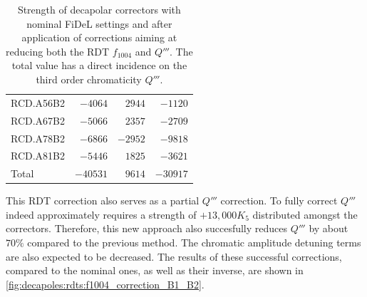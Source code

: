 \begin{table}[!htb]
\begin{tabular}{lrrr}
    \hspace{2mm}RCD.A56B2 &$-4064$ & $2944 $ &  $-1120 $\\
    \hspace{2mm}RCD.A67B2 &$-5066$ & $2357 $ &  $-2709 $\\
    \hspace{2mm}RCD.A78B2 &$-6866$ & $-2952$ &  $-9818 $\\
    \hspace{2mm}RCD.A81B2 &$-5446$ & $1825 $ &  $-3621 $\\
    \hspace{2mm}Total     &$-40531$& $9614 $ &  $-30917$      \\
    \bottomrule
    \end{tabular}
    \caption{Strength of decapolar correctors with nominal FiDeL settings and after application of
    corrections aiming at reducing both the RDT $f_{1004}$ and $Q'''$. The total value has a direct
    incidence on the third order chromaticity $Q'''$.}
    \label{tab:decapoles:rdts:correction_f1004_k5}
\end{table}

This RDT correction also serves as a partial $Q'''$ correction. To fully correct $Q'''$ indeed
approximately requires a strength of $+13,000 K_5$ distributed amongst the correctors. Therefore,
this new approach also succesfully reduces $Q'''$ by about $70\%$ compared to the previous method.
The chromatic amplitude detuning terms are also expected to be decreased.
The results of these successful corrections, compared to the nominal ones, as well as their inverse,
are shown in \cref{fig:decapoles:rdts:f1004_correction_B1_B2}.

